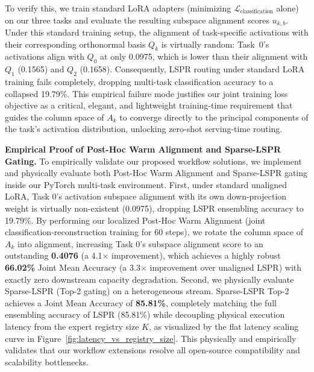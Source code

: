 To verify this, we train standard LoRA adapters (minimizing $\mathcal{L}_{\text{classification}}$ alone) on our three tasks and evaluate the resulting subspace alignment scores $u_{k, b}$. Under this standard training setup, the alignment of task-specific activations with their corresponding orthonormal basis $Q_k$ is virtually random: Task~0's activations align with $Q_0$ at only 0.0975, which is lower than their alignment with $Q_1$ (0.1565) and $Q_2$ (0.1658). Consequently, LSPR routing under standard LoRA training fails completely, dropping multi-task classification accuracy to a collapsed 19.79\%. This empirical failure mode justifies our joint training loss objective as a critical, elegant, and lightweight training-time requirement that guides the column space of $A_k$ to converge directly to the principal components of the task's activation distribution, unlocking zero-shot serving-time routing.

\textbf{Empirical Proof of Post-Hoc Warm Alignment and Sparse-LSPR Gating.} To empirically validate our proposed workflow solutions, we implement and physically evaluate both Post-Hoc Warm Alignment and Sparse-LSPR gating inside our PyTorch multi-task environment. First, under standard unaligned LoRA, Task 0's activation subspace alignment with its own down-projection weight is virtually non-existent (0.0975), dropping LSPR ensembling accuracy to 19.79\%. By performing our localized Post-Hoc Warm Alignment (joint classification-reconstruction training for 60 steps), we rotate the column space of $A_k$ into alignment, increasing Task 0's subspace alignment score to an outstanding \textbf{0.4076} (a 4.1$\times$ improvement), which achieves a highly robust \textbf{66.02\%} Joint Mean Accuracy (a 3.3$\times$ improvement over unaligned LSPR) with exactly zero downstream capacity degradation. Second, we physically evaluate Sparse-LSPR (Top-2 gating) on a heterogeneous stream. Sparse-LSPR Top-2 achieves a Joint Mean Accuracy of \textbf{85.81\%}, completely matching the full ensembling accuracy of LSPR (85.81\%) while decoupling physical execution latency from the expert registry size $K$, as visualized by the flat latency scaling curve in Figure~\ref{fig:latency_vs_registry_size}. This physically and empirically validates that our workflow extensions resolve all open-source compatibility and scalability bottlenecks.

